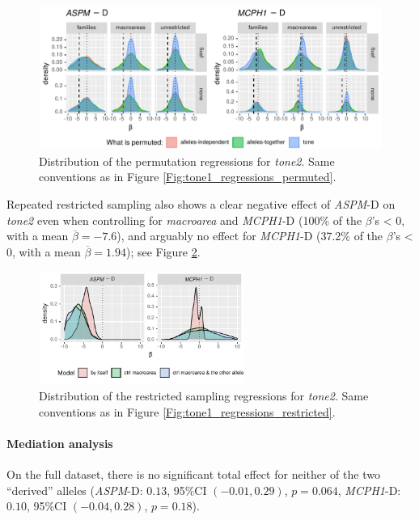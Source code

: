 \documentclass[twoside,onecolumn]{article}
\begin{document}
\begin{figure}[h]
  \centering
  \includegraphics[width=\textwidth]{../../code/figures/tone2_regressions_permuted}
  \caption{Distribution of the permutation regressions for \textit{tone2}. Same conventions as in Figure \ref{Fig:tone1_regressions_permuted}.}
  \label{Fig:tone2_regressions_permuted}
\end{figure}

Repeated restricted sampling also shows a clear negative effect of \textit{ASPM}-D on \textit{tone2} even when controlling for \textit{macroarea} and \textit{MCPH1}-D (100\% of the $\beta$'s < 0, with a mean $\overline{\beta} = -7.6$), and arguably no effect for \textit{MCPH1}-D (37.2\% of the $\beta$'s < 0, with a mean $\overline{\beta} = 1.94$); see Figure \ref{Fig:tone2_regressions_restricted}.

\begin{figure}[h]
  \centering
  \includegraphics[width=0.6\textwidth]{../../code/figures/tone2_regressions_restricted}
  \caption{Distribution of the restricted sampling regressions for \textit{tone2}. Same conventions as in Figure \ref{Fig:tone1_regressions_restricted}.}
  \label{Fig:tone2_regressions_restricted}
\end{figure}


\paragraph{Mediation analysis}

On the full dataset, there is no significant total effect for neither of the two ``derived'' alleles (\textit{ASPM}-D: $0.13$, 95\%CI $(-0.01, 0.29)$, $p=0.064$, \textit{MCPH1}-D: $0.10$, 95\%CI $(-0.04, 0.28)$, $p=0.18$).
\end{document}
